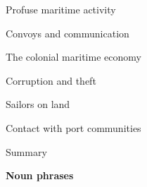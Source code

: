 \begin{listWWNumviileveli}
\begin{listWWNumviilevelii}
\setcounter{listWWNumviileveliii}{0}
\begin{listWWNumviileveliii}
\item 
\begin{styleListParagraph}
Profuse maritime activity
\end{styleListParagraph}
\item 
\begin{styleListParagraph}
Convoys and communication
\end{styleListParagraph}
\item 
\begin{styleListParagraph}
The colonial maritime economy 
\end{styleListParagraph}
\item 
\begin{styleListParagraph}
Corruption and theft 
\end{styleListParagraph}
\item 
\begin{styleListParagraph}
Sailors on land
\end{styleListParagraph}
\item 
\begin{styleListParagraph}
Contact with port communities 
\end{styleListParagraph}
\end{listWWNumviileveliii}
\item 
\begin{styleListParagraph}
Summary 
\end{styleListParagraph}
\end{listWWNumviilevelii}
\end{listWWNumviileveli}

\setcounter{listWWNumiileveli}{0}
\begin{listWWNumiileveli}
\item 
\begin{styleListParagraph}
\textbf{Noun phrases }
\end{styleListParagraph}
\end{listWWNumiileveli}

